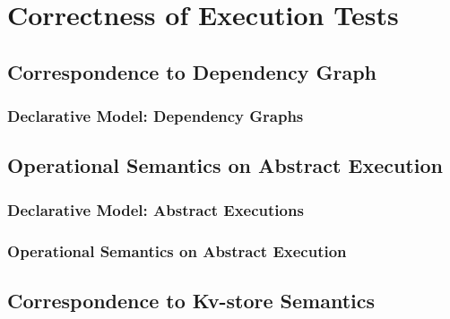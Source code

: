 \makeatletter
{}
\makeatother
\section{Correctness of Execution Tests}
\label{sec:relation}
\label{sec:sound-complete}



\subsection{Correspondence to Dependency Graph}
    
    \label{sec:dgraph} 
    \subsubsection{Declarative Model: Dependency Graphs} 
        \label{sec:dgraph-model} 
                    \label{sec:dgraph-isomorphism-kvstore}
                    
                    
\subsection{Operational Semantics on Abstract Execution}
    \label{sec:aexec}  
    \subsubsection{Declarative Model: Abstract Executions} 
                    \label{sec:aexec-model} 
    \subsubsection{Operational Semantics on Abstract Execution} 
                    \label{sec:aexec-semantics} 
                    \label{sec:aexec-op-semantics-and-axiom} 

\subsection{Correspondence to Kv-store Semantics}
    \label{sec:kv-aexec-trace-equivalent}
                    \label{sec:aexec-vs-kv-store} 
                    \label{sec:et-trace-to-aexec} 
                    \label{sec:aexec-to-et-trace} 

